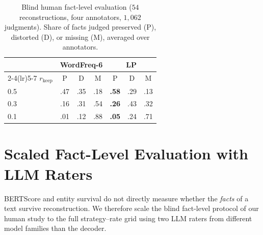 \documentclass[11pt]{article}
\newcommand{\rkeep}{r_{\mathrm{keep}}}
\begin{document}
\begin{table}[htbp]
\centering
\small
\setlength{\tabcolsep}{4pt}
\caption{Blind human fact-level evaluation ($54$ reconstructions, four annotators, $1{,}062$ judgments).
Share of facts judged preserved (P), distorted (D), or missing (M), averaged over annotators.}
\label{tab:human_eval}
\begin{tabular}{lcccccc}
\toprule
& \multicolumn{3}{c}{\textbf{WordFreq-6}} & \multicolumn{3}{c}{\textbf{LP}} \\
\cmidrule(lr){2-4}\cmidrule(lr){5-7}
$\rkeep$ & P & D & M & P & D & M \\
\midrule
0.5 & .47 & .35 & .18 & \textbf{.58} & .29 & .13 \\
0.3 & .16 & .31 & .54 & \textbf{.26} & .43 & .32 \\
0.1 & .01 & .12 & .88 & \textbf{.05} & .24 & .71 \\
\bottomrule
\end{tabular}
\end{table}

\section{Scaled Fact-Level Evaluation with LLM Raters}
\label{app:fact_eval}

BERTScore and entity survival do not directly measure whether the \emph{facts} of a text survive
reconstruction. We therefore scale the blind fact-level protocol of our human study to the full
strategy--rate grid using two LLM raters from different model families than the decoder.
\end{document}
